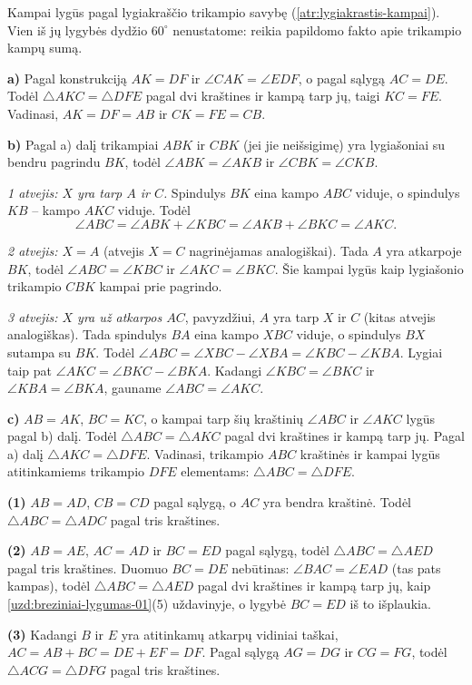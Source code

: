 \documentclass[12pt,a4paper,reqno]{amsart}
\theoremstyle{plain}\newtheorem{theorem}{Teorema}[section]
\theoremstyle{definition}
\theoremstyle{remark}\newtheorem{remark}[theorem]{Pastaba}\newtheorem*{remark*}{Pastaba}
\theoremstyle{definition}\newtheorem*{problem*}{Uždavinys}
\begin{document}
\begin{solution}[\ref{uzd:lygiakrastis-kampai-01}] Kampai lygūs pagal lygiakraščio trikampio savybę (\ref{atr:lygiakrastis-kampai}). Vien iš jų lygybės dydžio $60^\circ$ nenustatome: reikia papildomo fakto apie trikampio kampų sumą. \end{solution}
\begin{solution}[\ref{atr:sss-poz}]
\textbf{a)} Pagal konstrukciją $AK=DF$ ir $\angle CAK=\angle EDF$, o pagal sąlygą $AC=DE$. Todėl $\triangle AKC=\triangle DFE$ pagal dvi kraštines ir kampą tarp jų, taigi $KC=FE$. Vadinasi, $AK=DF=AB$ ir $CK=FE=CB$.

\textbf{b)} Pagal a) dalį trikampiai $ABK$ ir $CBK$ (jei jie neišsigimę) yra lygiašoniai su bendru pagrindu $BK$, todėl $\angle ABK=\angle AKB$ ir $\angle CBK=\angle CKB$.

\emph{1 atvejis: $X$ yra tarp $A$ ir $C$.} Spindulys $BK$ eina kampo $ABC$ viduje, o spindulys $KB$ – kampo $AKC$ viduje. Todėl
\[
\angle ABC=\angle ABK+\angle KBC=\angle AKB+\angle BKC=\angle AKC.
\]

\emph{2 atvejis: $X=A$} (atvejis $X=C$ nagrinėjamas analogiškai). Tada $A$ yra atkarpoje $BK$, todėl $\angle ABC=\angle KBC$ ir $\angle AKC=\angle BKC$. Šie kampai lygūs kaip lygiašonio trikampio $CBK$ kampai prie pagrindo.

\emph{3 atvejis: $X$ yra už atkarpos $AC$}, pavyzdžiui, $A$ yra tarp $X$ ir $C$ (kitas atvejis analogiškas). Tada spindulys $BA$ eina kampo $XBC$ viduje, o spindulys $BX$ sutampa su $BK$. Todėl $\angle ABC=\angle XBC-\angle XBA=\angle KBC-\angle KBA$. Lygiai taip pat $\angle AKC=\angle BKC-\angle BKA$. Kadangi $\angle KBC=\angle BKC$ ir $\angle KBA=\angle BKA$, gauname $\angle ABC=\angle AKC$.

\textbf{c)} $AB=AK$, $BC=KC$, o kampai tarp šių kraštinių $\angle ABC$ ir $\angle AKC$ lygūs pagal b) dalį. Todėl $\triangle ABC=\triangle AKC$ pagal dvi kraštines ir kampą tarp jų. Pagal a) dalį $\triangle AKC=\triangle DFE$. Vadinasi, trikampio $ABC$ kraštinės ir kampai lygūs atitinkamiems trikampio $DFE$ elementams: $\triangle ABC=\triangle DFE$.
\end{solution}
\begin{solution}[\ref{uzd:sss-breziniai-01}]
\textbf{(1)} $AB=AD$, $CB=CD$ pagal sąlygą, o $AC$ yra bendra kraštinė. Todėl $\triangle ABC=\triangle ADC$ pagal tris kraštines.\par
\textbf{(2)} $AB=AE$, $AC=AD$ ir $BC=ED$ pagal sąlygą, todėl $\triangle ABC=\triangle AED$ pagal tris kraštines. Duomuo $BC=DE$ nebūtinas: $\angle BAC=\angle EAD$ (tas pats kampas), todėl $\triangle ABC=\triangle AED$ pagal dvi kraštines ir kampą tarp jų, kaip \ref{uzd:breziniai-lygumas-01}(5) uždavinyje, o lygybė $BC=ED$ iš to išplaukia.\par
\textbf{(3)} Kadangi $B$ ir $E$ yra atitinkamų atkarpų vidiniai taškai, $AC=AB+BC=DE+EF=DF$. Pagal sąlygą $AG=DG$ ir $CG=FG$, todėl $\triangle ACG=\triangle DFG$ pagal tris kraštines.
\end{solution}
\end{document}

